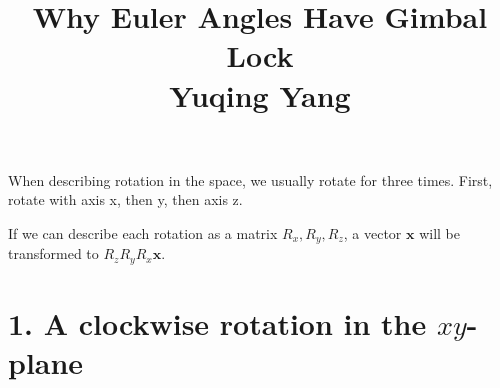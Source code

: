 \documentclass[10pt]{article}
\title{Why Euler Angles Have Gimbal Lock\\\large Yuqing Yang}
\author{}
\date{}
\newcommand{\vect}[1]{\boldsymbol{#1}}
\begin{document}
\maketitle
\vspace{-1.4em}

When describing rotation in the space, we usually rotate for three times. First, rotate with axis x, then y, then axis z.

If we can describe each rotation as a matrix $R_x, R_y, R_z$, a vector $\vect x$ will be transformed to $R_z R_y R_x \vect x$.

\section*{1. A clockwise rotation in the $xy$-plane}
\end{document}

